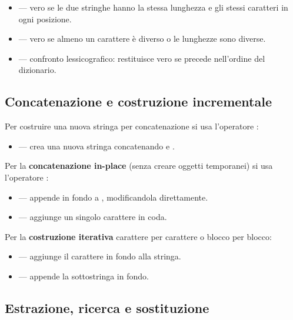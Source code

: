 \begin{itemize}
    \item {} --- vero se le due stringhe hanno la stessa
          lunghezza e gli stessi caratteri in ogni posizione.
    \item {} --- vero se almeno un carattere \`e diverso
          o le lunghezze sono diverse.
    \item {} --- confronto lessicografico: restituisce vero
          se  precede  nell'ordine del dizionario.
\end{itemize}

\subsection{Concatenazione e costruzione incrementale}

Per costruire una nuova stringa per concatenazione si usa l'operatore \inlinecode{+}:

\begin{itemize}
    \item {} --- crea una nuova stringa concatenando
           e .
\end{itemize}

Per la \textbf{concatenazione in-place} (senza creare oggetti temporanei) si usa
l'operatore \inlinecode{+=}:

\begin{itemize}
    \item {} --- appende  in fondo a ,
          modificandola direttamente.
    \item {} --- aggiunge un singolo carattere in coda.
\end{itemize}

Per la \textbf{costruzione iterativa} carattere per carattere o blocco per blocco:

\begin{itemize}
    \item {} --- aggiunge il carattere 
          in fondo alla stringa.
    \item {} --- appende la sottostringa
           in fondo.
\end{itemize}

\subsection{Estrazione, ricerca e sostituzione}

